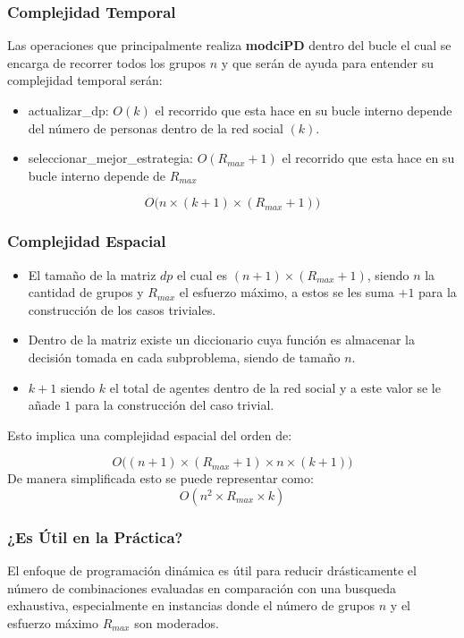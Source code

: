 \documentclass[11pt,letter]{article}
\begin{document}
\begin{itemize}
    \subsubsection{Complejidad Temporal}

    Las operaciones que principalmente realiza \textbf{modciPD} dentro del bucle el cual se encarga de recorrer todos los grupos $n$ y que serán de ayuda para entender su complejidad temporal serán:

    \begin{itemize}
        \item actualizar\_dp: $O(k)$ el recorrido que esta hace en su bucle interno depende del número de personas dentro de la red social $(k)$.

        \item seleccionar\_mejor\_estrategia: $O(R_{max}+1)$ el recorrido que esta hace en su bucle interno depende de $R_{max}$
    \end{itemize}

    $$O\bigg(n\times (k+1) \times (R_{max}+1)\bigg)$$

    \subsubsection{Complejidad Espacial}

    \begin{itemize}
        \item El tamaño de la matriz $dp$ el cual es $(n+1) \times (R_{max}+1)$, siendo $n$ la cantidad de grupos y $R_{max}$ el esfuerzo máximo, a estos se les suma $+1$ para la construcción de los casos triviales.
        \item Dentro de la matriz existe un diccionario cuya función es almacenar la decisión tomada en cada subproblema, siendo de tamaño $n$.
        \item $k+1$ siendo $k$ el total de agentes dentro de la red social y a este valor se le añade $1$ para la construcción del caso trivial.
    \end{itemize}

    Esto implica una complejidad espacial del orden de:

    \[
        O\bigg((n+1) \times (R_{max}+1) \times n \times (k+1)\bigg)
    \]
    De manera simplificada esto se puede representar como:
    \[
        O(n^2 \times R_{max} \times k)
    \]

    \subsubsection{¿Es Útil en la Práctica?}
    El enfoque de programación dinámica es útil para reducir drásticamente el número de combinaciones evaluadas en comparación con una busqueda exhaustiva, especialmente en instancias donde el número de grupos $n$ y el esfuerzo máximo $R_{max}$ son moderados.


\end{itemize}
\end{document}
